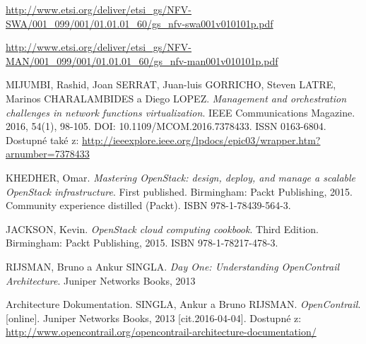 \begin{thebibliography}{10}
\url{http://www.etsi.org/deliver/etsi_gs/NFV-SWA/001_099/001/01.01.01_60/gs_nfv-swa001v010101p.pdf}

\url{http://www.etsi.org/deliver/etsi_gs/NFV-MAN/001_099/001/01.01.01_60/gs_nfv-man001v010101p.pdf}

MIJUMBI, Rashid, Joan SERRAT, Juan-luis GORRICHO, Steven LATRE, Marinos CHARALAMBIDES a Diego LOPEZ. \emph{Management and orchestration challenges in network functions virtualization}. IEEE Communications Magazine. 2016, 54(1), 98-105. DOI: 10.1109/MCOM.2016.7378433. ISSN 0163-6804. Dostupné také z: \url{http://ieeexplore.ieee.org/lpdocs/epic03/wrapper.htm?arnumber=7378433}

 KHEDHER, Omar. \emph{Mastering OpenStack: design, deploy, and manage a scalable OpenStack infrastructure}. First published. Birmingham: Packt Publishing, 2015. Community experience distilled (Packt). ISBN 978-1-78439-564-3.

JACKSON, Kevin. \emph{OpenStack cloud computing cookbook}. Third Edition. Birmingham: Packt Publishing, 2015. ISBN 978-1-78217-478-3.

 RIJSMAN, Bruno a Ankur SINGLA. \emph{Day One: Understanding OpenContrail Architecture}. Juniper Networks Books, 2013

 Architecture   Dokumentation.   SINGLA,   Ankur   a   Bruno   RIJSMAN. \emph{OpenContrail}. [online].  Juniper  Networks  Books,   2013  [cit.2016-04-04]. Dostupné    z: \url{http://www.opencontrail.org/opencontrail-architecture-documentation/}








\end{thebibliography}